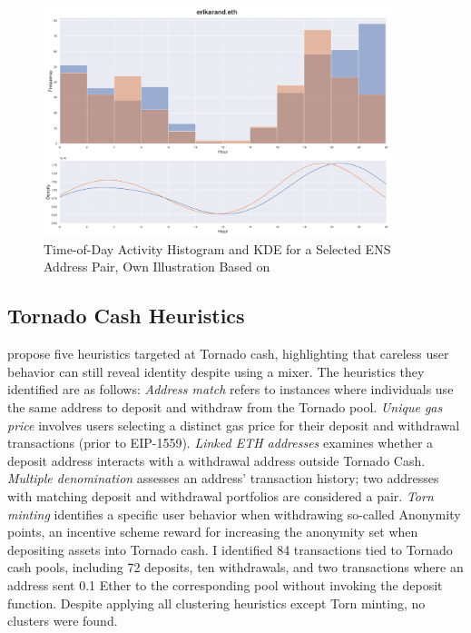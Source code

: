 \documentclass[12pt,a4paper,titlepage,oneside,english]{article}
\begin{document}
\begin{figure}[h!]
	\centering
	\includegraphics[width=0.9\textwidth]{./figures/time-of-day-activity.png}
	\caption{Time-of-Day Activity Histogram and KDE for a Selected ENS Address Pair, Own Illustration Based on \cite{Beres2020}}
	\label{fig:ToD}
\end{figure} 

\subsection{Tornado Cash Heuristics}
\cite{wu2022tutela} propose five heuristics targeted at Tornado cash, highlighting that careless user behavior can still reveal identity despite using a mixer. The heuristics they identified are as follows: \newline
\textit{Address match} refers to instances where individuals use the same address to deposit and withdraw from the Tornado pool. \textit{Unique gas price} involves users selecting a distinct gas price for their deposit and withdrawal transactions (prior to EIP-1559). \textit{Linked ETH addresses} examines whether a deposit address interacts with a withdrawal address outside Tornado Cash. \textit{Multiple denomination} assesses an address' transaction history; two addresses with matching deposit and withdrawal portfolios are considered a pair. \textit{Torn minting} identifies a specific user behavior when withdrawing so-called Anonymity points, an incentive scheme reward for increasing the anonymity set when depositing assets into Tornado cash.\newline
I identified 84 transactions tied to Tornado cash pools, including 72 deposits, ten withdrawals, and two transactions where an address sent 0.1 Ether to the corresponding pool without invoking the deposit function.  Despite applying all clustering heuristics except Torn minting, no clusters were found.
\end{document}
